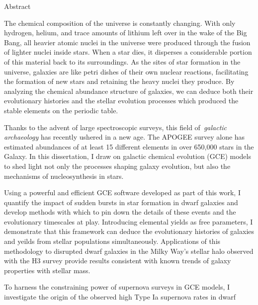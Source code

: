 \documentclass[main.tex]{subfiles}
\begin{document}
\null\par\null\par\null\par\null\par
\begin{center}
{\large Abstract}
\end{center}

\begin{doublespace}

The chemical composition of the universe is constantly changing.
With only hydrogen, helium, and trace amounts of lithium left over in the wake
of the Big Bang, all heavier atomic nuclei in the universe were produced
through the fusion of lighter nuclei inside stars.
When a star dies, it disperses a considerable portion of this material back to
its surroundings.
As the sites of star formation in the universe, galaxies are like petri
dishes of their own nuclear reactions, facilitating the formation of new
stars and retaining the heavy nuclei they produce.
By analyzing the chemical abundance structure of galaxies, we can deduce both
their evolutionary histories and the stellar evolution processes which
produced the stable elements on the periodic table.
\par
Thanks to the advent of large spectroscopic surveys, this field
of~\textit{galactic archaeology} has recently ushered in a new age.
The APOGEE survey alone has estimated abundances of at least 15 different
elements in over 650,000 stars in the Galaxy.
In this dissertation, I draw on galactic chemical evolution (GCE) models to
shed light not only the processes shaping galaxy evolution, but also the
mechanisms of nucleosynthesis in stars.
\par
Using a powerful and efficient GCE software developed as part of this work,
I quantify the impact of sudden bursts in star formation in dwarf galaxies and
develop methods with which to pin down the details of these events and the
evolutionary timescales at play.
Introducing elemental yields as free parameters, I demonstrate that this
framework can deduce the evolutionary histories of galaxies and yeilds from
stellar populations simultaneously.
Applications of this methodology to disrupted dwarf galaxies in the Milky Way's
stellar halo observed with the H3 survey provide results consistent with
known trends of galaxy properties with stellar mass.
\par
To harness the constraining power of supernova surveys in GCE models, I
investigate the origin of the observed high Type Ia supernova rates in dwarf

\end{doublespace}
\end{document}
